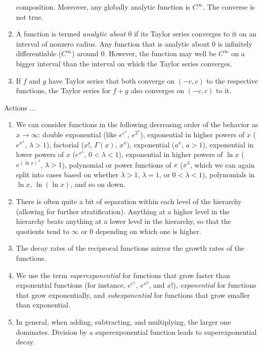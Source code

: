 \documentclass{amsart}
\begin{document}
\begin{enumerate}
  composition. Moreover, any globally analytic function is
  $C^\infty$. The converse is not true.
\item A function is termed {\em analytic about $0$} if its Taylor
  series converges to it on an interval of nonzero radius. Any
  function that is analytic about $0$ is infinitely differentiable
  ($C^\infty$) around $0$. However, the function may well be
  $C^\infty$ on a bigger interval than the interval on which the
  Taylor series converges.
\item If $f$ and $g$ have Taylor series that both converge on $(-c,c)$
  to the respective functions, the Taylor series for $f + g$ also
  converges on $(-c,c)$ to it.
\end{enumerate}

Actions ...

\begin{enumerate}
\item We can consider functions in the following decreasing order of
  the behavior as $x \to \infty$: double exponential (like $e^{e^x}$,
  $e^{2^x}$), exponential in higher powers of $x$ ($e^{x^\lambda}$,
  $\lambda > 1$), factorial ($x!$, $\Gamma(x)$, $x^x$), exponential
  ($a^x$, $a > 1$), exponential in lower powers of $x$
  ($e^{x^\lambda}$, $0 < \lambda < 1$), exponential in higher powers
  of $\ln x$ ($e^{(\ln x)^\lambda}$, $\lambda > 1$), polynomial or
  power functions of $x$ ($x^\lambda$, which we can again split into
  cases based on whether $\lambda > 1$, $\lambda = 1$, or $0 < \lambda
  < 1$), polynomials in $\ln x$, $\ln(\ln x)$, and so on down.
\item There is often quite a bit of separation within each level of
  the hierarchy (allowing for further stratification). Anything at a
  higher level in the hierarchy beats anything at a lower level in the
  hierarchy, so that the quotients tend to $\infty$ or $0$ depending
  on which one is higher.
\item The decay rates of the reciprocal functions mirror the growth
  rates of the functions.
\item We use the term {\em superexponential} for functions that grow
  faster than exponential functions (for instance, $e^{e^x}$,
  $e^{x^2}$, and $x!$), {\em exponential} for functions that grow
  exponentially, and {\em subexponential} for functions that grow
  smaller than exponential.
\item In general, when adding, subtracting, and multiplying, the
  larger one dominates. Division by a superexponential function leads
  to superexponential decay.

\end{enumerate}
\end{document}
